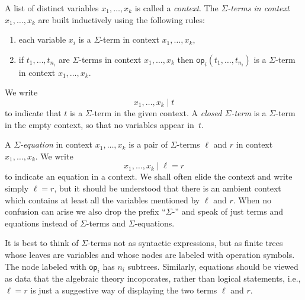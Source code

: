 \documentclass{amsart}
\newcommand{\op}{\mathsf{op}}
\begin{document}
A list of distinct variables $x_1, \ldots, x_k$ is called a \emph{context}. The
\emph{$\Sigma$-terms in context $x_1, \ldots, x_k$} are built inductively using the
following rules:
% 
\begin{enumerate}
\item each variable $x_i$ is a $\Sigma$-term in context $x_1, \ldots, x_k$,
\item if $t_1, \ldots, t_{n_i}$ are $\Sigma$-terms in context $x_1, \ldots, x_k$ then
  $\op_i(t_1, \ldots, t_{n_i})$ is a $\Sigma$-term in context $x_1, \ldots, x_k$.
\end{enumerate}
%
We write
%
\begin{equation*}
  x_1, \ldots, x_k \mid t
\end{equation*}
%
to indicate that $t$ is a $\Sigma$-term in the given context. A \emph{closed
  $\Sigma$-term} is a $\Sigma$-term in the empty context, so that no variables appear
in~$t$.

A \emph{$\Sigma$-equation} in context $x_1, \ldots, x_k$ is a pair of $\Sigma$-terms
$\ell$ and $r$ in context $x_1, \ldots, x_k$. We write
%
\begin{equation*}
  x_1, \ldots, x_k \mid \ell = r
\end{equation*}
%
to indicate an equation in a context. We shall often elide the context and write simply
$\ell = r$, but it should be understood that there is an ambient context which contains at
least all the variables mentioned by $\ell$ and $r$. When no confusion can arise we also
drop the prefix ``$\Sigma$-'' and speak of just terms and equations instead of
$\Sigma$-terms and $\Sigma$-equations.

It is best to think of $\Sigma$-terms not as syntactic expressions, but as finite trees
whose leaves are variables and whose nodes are labeled with operation symbols. The node
labeled with $\op_i$ has $n_i$ subtrees. Similarly, equations should be viewed as data
that the algebraic theory incoporates, rather than logical statements, i.e., $\ell = r$ is
just a suggestive way of displaying the two terms $\ell$ and $r$.
\end{document}
